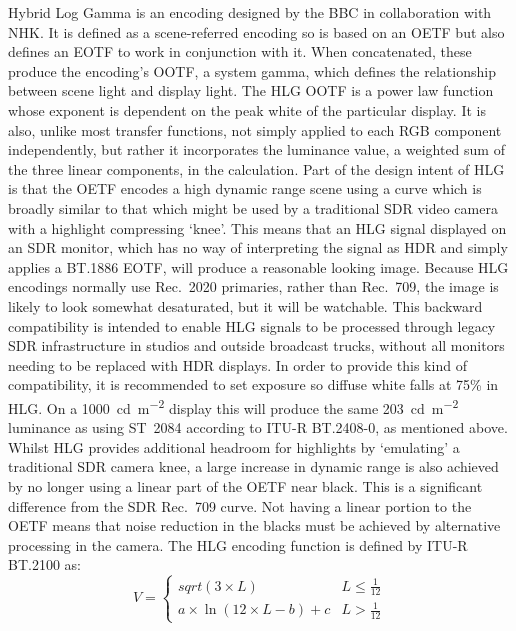 Hybrid Log Gamma is an encoding designed by the BBC in collaboration with NHK.
It is defined as a scene-referred encoding so is based on an OETF but also defines an EOTF to work in conjunction with it.
When concatenated, these produce the encoding's OOTF, a system gamma, which defines the relationship between scene light and display light.
The HLG OOTF is a power law function whose exponent is dependent on the peak white of the particular display.
It is also, unlike most transfer functions, not simply applied to each RGB component independently, but rather it incorporates the luminance value, a weighted sum of the three linear components, in the calculation.
\ccPar{}
Part of the design intent of HLG is that the OETF encodes a high dynamic range scene using a curve which is broadly similar to that which might be used by a traditional SDR video camera with a highlight compressing `knee'.
This means that an HLG signal displayed on an SDR monitor, which has no way of interpreting the signal as HDR and simply applies a BT.1886 EOTF, will produce a reasonable looking image.
Because HLG encodings normally use Rec.~2020 primaries, rather than Rec.~709, the image is likely to look somewhat desaturated, but it will be watchable.
This backward compatibility is intended to enable HLG signals to be processed through legacy SDR infrastructure in studios and outside broadcast trucks, without all monitors needing to be replaced with HDR displays.
In order to provide this kind of compatibility, it is recommended to set exposure so diffuse white falls at 75\% in HLG.
On a \SI{1000}{\candela\per\metre\squared} display this will produce the same \SI{203}{\candela\per\metre\squared} luminance as using ST~2084 according to ITU-R BT.2408-0, as mentioned above.
\ccPar{}
Whilst HLG provides additional headroom for highlights by `emulating' a traditional SDR camera knee, a large increase in dynamic range is also achieved by no longer using a linear part of the OETF near black.
This is a significant difference from the SDR Rec.~709 curve.
Not having a linear portion to the OETF means that noise reduction in the blacks must be achieved by alternative processing in the camera.
\ccPar{}
The HLG encoding function is defined by ITU-R BT.2100 \parencite{InternationalTelecommunicationUnion2016a} as:
\begin{equation}
    V =
    \begin{cases}
        sqrt(3 \times L) & L \leq \frac{1}{12} \\
        a \times \ln (12 \times L - b) + c & L >  \frac{1}{12}
    \end{cases}
\end{equation}

